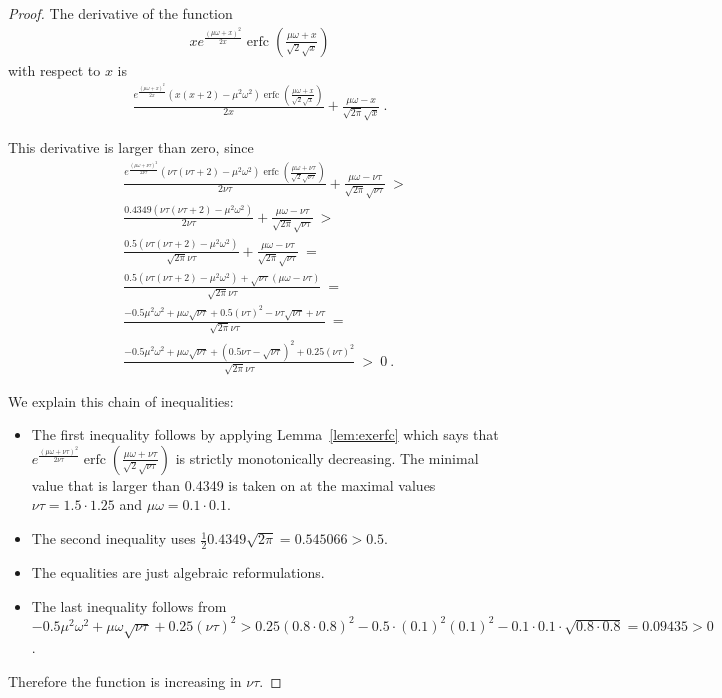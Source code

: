 \documentclass{article}
\DeclareMathOperator{\erfc}{erfc}
\begin{document}
\begin{proof}

The derivative of the function
\begin{align}
x e^{\frac{(\mu \omega+x)^2}{2 x}} \erfc \left(\frac{\mu \omega+x}{\sqrt{2} \sqrt{x}}\right)
\end{align}
with respect to $x$ is
\begin{align}
\frac{e^{\frac{(\mu \omega+x)^2}{2 x}} \left(x (x+2)-\mu^2 \omega^2\right) \erfc \left(\frac{\mu \omega+x}{\sqrt{2} \sqrt{x}}\right)}{2 x}+\frac{\mu \omega-x}{\sqrt{2 \pi } \sqrt{x}} \ .
\end{align}

This derivative is larger than zero, since
\begin{align}
&\frac{e^{\frac{(\mu \omega+\nu \tau)^2}{2 \nu \tau}} \left(\nu \tau (\nu \tau+2)-\mu^2 \omega^2\right) \erfc \left(\frac{\mu \omega+\nu \tau}{\sqrt{2} \sqrt{\nu \tau}}\right)}{2 \nu \tau}+\frac{\mu \omega-\nu \tau}{\sqrt{2 \pi } \sqrt{\nu \tau}}
\ > \\\nonumber
&\frac{0.4349 \left(\nu \tau (\nu \tau+2)-\mu^2 \omega^2\right)}{2 \nu \tau}+\frac{\mu \omega-\nu \tau}{\sqrt{2 \pi } \sqrt{\nu \tau}}
\ > \\\nonumber
&\frac{0.5 \left(\nu \tau (\nu \tau+2)-\mu^2 \omega^2\right)}{\sqrt{2 \pi } \nu \tau}+\frac{\mu \omega-\nu \tau}{\sqrt{2 \pi } \sqrt{\nu \tau}}
\ = \\\nonumber
&\frac{0.5 \left(\nu \tau (\nu \tau+2)-\mu^2 \omega^2\right)+\sqrt{\nu \tau} (\mu \omega-\nu \tau)}{\sqrt{2 \pi } \nu \tau}
\ = \\\nonumber
&\frac{-0.5 \mu^2 \omega^2+\mu \omega \sqrt{\nu \tau}+0.5 (\nu \tau)^2-\nu \tau \sqrt{\nu \tau}+\nu \tau}{\sqrt{2 \pi } \nu \tau}
\ = \\\nonumber
&\frac{-0.5 \mu^2 \omega^2+\mu \omega \sqrt{\nu
  \tau}+\left(0.5 \nu \tau-\sqrt{\nu
  \tau}\right)^2+0.25 (\nu \tau)^2}{\sqrt{2 \pi }
  \nu \tau} \ > \ 0 \ .
\end{align}

We explain this chain of inequalities:
\begin{itemize}
\item The first inequality follows by applying Lemma~\ref{lem:exerfc}
  which says that $e^{\frac{(\mu \omega+\nu \tau)^2}{2
      \nu \tau}} \erfc \left(\frac{\mu
      \omega+\nu \tau}{\sqrt{2} \sqrt{\nu
        \tau}}\right)$ 
is strictly monotonically decreasing. The minimal value that is larger
than 0.4349 is taken on at
the maximal values $\nu
\tau=1.5 \cdot 1.25$ and $\mu \omega=0.1 \cdot 0.1$. 
\item The second inequality uses 
$\frac{1}{2} 0.4349 \sqrt{2 \pi } = 0.545066 > 0.5$.
\item The equalities are just algebraic reformulations.
\item The last inequality follows from
$-0.5 \mu^2 \omega^2+\mu \omega \sqrt{\nu \tau}+0.25 (\nu \tau)^2>0.25 (0.8 \cdot 0.8)^2-0.5 \cdot (0.1)^2(0.1)^2-0.1 \cdot 0.1 \cdot \sqrt{0.8 \cdot 0.8}=0.09435>0$.
\end{itemize}
Therefore the function is increasing in  $\nu \tau$.


\end{proof}
\end{document}
